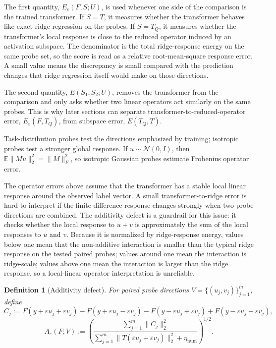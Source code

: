 \documentclass[11pt]{article}
\newtheorem{definition}{Definition}
\newcommand{\E}{\mathbb{E}}
\begin{document}
The first quantity, \(E_\varepsilon(F,S;U)\), is used whenever one side of the comparison is the
trained transformer. If \(S=T\), it measures whether the transformer behaves like exact ridge
regression on the probes. If \(S=T_Q\), it measures whether the transformer's local response is close
to the reduced operator induced by an activation subspace. The denominator is the total
ridge-response energy on the same probe set, so the score is read as a relative root-mean-square
response error. A small value means the discrepancy is small compared with the prediction changes
that ridge regression itself would make on those directions.

The second quantity, \(E(S_1,S_2;U)\), removes the transformer from the comparison and only asks
whether two linear operators act similarly on the same probes. This is why later sections can
separate transformer-to-reduced-operator error, \(E_\varepsilon(F,T_Q)\), from subspace error,
\(E(T_Q,T)\).

Task-distribution probes test the directions emphasized by training; isotropic probes test a
stronger global response. If \(u\sim\mathcal{N}(0,I)\), then \(\E\|Mu\|_2^2=\|M\|_F^2\), so isotropic
Gaussian probes estimate Frobenius operator error.

The operator errors above assume that the transformer has a stable local linear response around
the observed label vector. A small transformer-to-ridge error is hard to interpret if the
finite-difference response changes strongly when two probe directions are combined. The additivity
defect is a guardrail for this issue: it checks whether the local response to \(u+v\) is approximately
the sum of the local responses to \(u\) and \(v\). Because it is normalized by ridge-response
energy, values below one mean that the non-additive interaction is smaller than the typical ridge
response on the tested paired probes; values around one mean the interaction is ridge-scale; values
above one mean the interaction is larger than the ridge response, so a local-linear operator
interpretation is unreliable.

\begin{definition}[Additivity defect]
For paired probe directions \(V=\{(u_j,v_j)\}_{j=1}^m\), define
\[
C_j :=
F(y+\varepsilon u_j+\varepsilon v_j)
-F(y+\varepsilon u_j-\varepsilon v_j)
-F(y-\varepsilon u_j+\varepsilon v_j)
+F(y-\varepsilon u_j-\varepsilon v_j),
\]
\[
A_\varepsilon(F;V)
:=
\left(
\frac{
\sum_{j=1}^m\|C_j\|_2^2
}{
\sum_{j=1}^m\|T(\varepsilon u_j+\varepsilon v_j)\|_2^2+\eta_{\mathrm{num}}
}
\right)^{1/2}.
\]
\end{definition}
\end{document}
